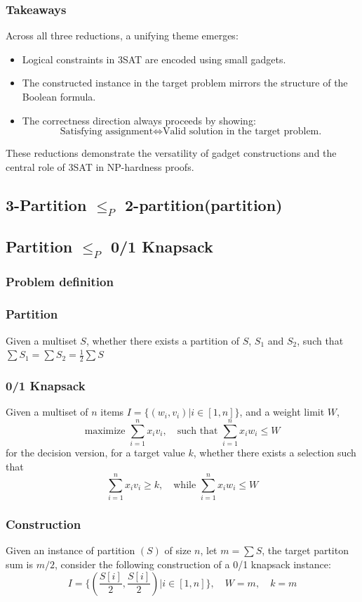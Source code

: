 \documentclass[9pt]{extarticle}
\begin{document}
\subsubsection{Takeaways}
Across all three reductions, a unifying theme emerges:
\begin{itemize}
    \item Logical constraints in 3SAT are encoded using small gadgets.
    \item The constructed instance in the target problem mirrors the structure
          of the Boolean formula.
    \item The correctness direction always proceeds by showing:
          \[
          \text{Satisfying assignment} \iff \text{Valid solution in the target problem.}
          \]
\end{itemize}
These reductions demonstrate the versatility of gadget constructions and the
central role of 3SAT in NP-hardness proofs.
\subsection{3-Partition $\leq_P$ 2-partition(partition)}
\subsection{Partition $\leq_P$ 0/1 Knapsack}
\subsubsection*{Problem definition} 
\subsubsection*{Partition}
Given a multiset $S$, whether there exists a partition of $S$, $S_1$ and $S_2$, such that $\sum S_1 = \sum S_2 = \frac{1}{2} \sum S$
\subsubsection*{0/1 Knapsack}
Given a multiset of $n$ items $I = \{(w_i, v_i) | i \in [1,n]\}$, and a weight limit $W$, 
\[\text{maximize } \sum_{i=1}^{n} x_iv_i, \quad\text{such that } \sum_{i=1}^{n}x_iw_i \leq W\]
for the decision version, for a target value $k$, whether there exists a selection such that 
\[\sum_{i=1}^{n} x_iv_i \geq k, \quad\text{while } \sum_{i=1}^{n}x_iw_i \leq W\]
\subsubsection*{Construction} 
Given an instance of partition $(S)$ of size $n$, let $m = \sum S$, the target partiton sum is $m/2$, consider the following construction of a 0/1 knapsack instance:
\[I = \{(\frac{S[i]}{2}, \frac{S[i]}{2}) | i \in [1,n]\}, \quad{W = m}, \quad k = m\]
\end{document}
